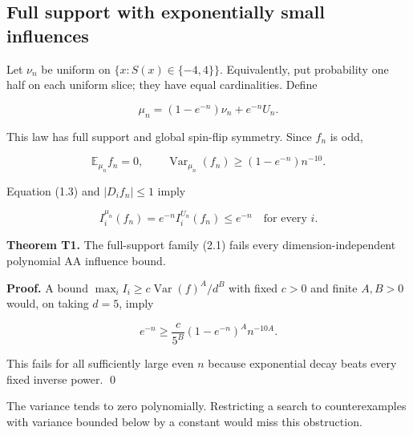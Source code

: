 \subsection{Full support with exponentially small
influences}\label{proof:thin_shell_obstruction:full-support-with-exponentially-small-influences}

Let \(\nu _n\) be uniform on \(\{x:S(x)\in\{-4,4\}\}\). Equivalently,
put probability one half on each uniform slice; they have equal
cardinalities. Define

\[
\mu_n=(1-e^{-n})\nu_n+e^{-n}U_n.
\tag{2.1}
\]

This law has full support and global spin-flip symmetry. Since \(f_n\)
is odd,

\[
\mathbb E_{\mu_n}f_n=0,\qquad
\operatorname{Var}_{\mu_n}(f_n)\ge(1-e^{-n})n^{-10}.
\tag{2.2}
\]

Equation (1.3) and \(|D_if_n|\le 1\) imply

\[
I_i^{\mu_n}(f_n)=e^{-n}I_i^{U_n}(f_n)\le e^{-n}\quad\text{for every }i.
\tag{2.3}
\]

\textbf{Theorem T1.} The full-support family (2.1) fails every
dimension-independent polynomial AA influence bound.

\textbf{Proof.} A bound \(\max _i I_i\ge c \operatorname{Var}(f)^A/d^B\)
with fixed \(c>0\) and finite \(A,B>0\) would, on taking \(d=5\), imply

\[
e^{-n}\ge\frac{c}{5^B}(1-e^{-n})^A n^{-10A}.
\]

This fails for all sufficiently large even \(n\) because exponential decay
beats every fixed inverse power. \qed

The variance tends to zero polynomially. Restricting a search to
counterexamples with variance bounded below by a constant would miss
this obstruction.
